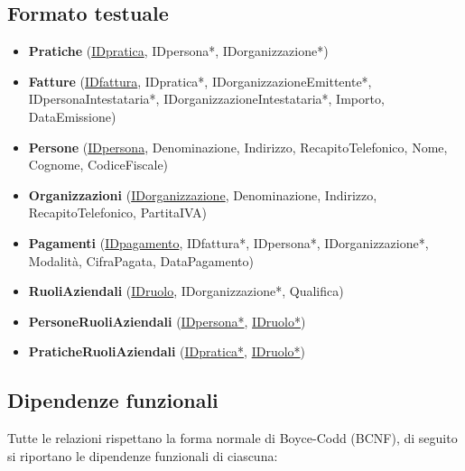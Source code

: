 \documentclass[a4paper,12pt]{article}
\begin{document}
 \subsection{ Formato testuale }

\begin{itemize}
\item \textbf{Pratiche} (\underline{IDpratica}, IDpersona*, IDorganizzazione*)

\item \textbf{Fatture} (\underline{IDfattura}, IDpratica*, IDorganizzazioneEmittente*, IDpersonaIntestataria*, IDorganizzazioneIntestataria*, Importo, DataEmissione)

\item \textbf{Persone} (\underline{IDpersona}, Denominazione, Indirizzo, RecapitoTelefonico, Nome, Cognome, CodiceFiscale)

\item \textbf{Organizzazioni} (\underline{IDorganizzazione}, Denominazione, Indirizzo, RecapitoTelefonico, PartitaIVA)

\item \textbf{Pagamenti} (\underline{IDpagamento}, IDfattura*, IDpersona*, IDorganizzazione*, Modalità, CifraPagata, DataPagamento)

\item \textbf{RuoliAziendali} (\underline{IDruolo}, IDorganizzazione*, Qualifica)

\item \textbf{PersoneRuoliAziendali} (\underline{IDpersona*}, \underline{IDruolo*})

\item \textbf{PraticheRuoliAziendali} (\underline{IDpratica*}, \underline{IDruolo*})
\end{itemize}


 \subsection{ Dipendenze funzionali }

Tutte le relazioni rispettano la forma normale di Boyce-Codd (BCNF), di seguito si riportano le dipendenze funzionali di ciascuna:
\end{document}
